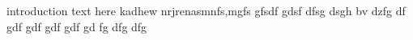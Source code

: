 introduction text here kadhew nrjrenasmnfs,mgfs gfsdf gdsf dfsg dsgh bv dzfg df gdf gdf gdf gdf gd fg dfg dfg